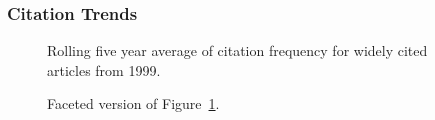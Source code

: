 \documentclass[
  10pt,
  letterpaper,
  DIV=11,
  numbers=noendperiod,
  twoside]{scrartcl}
\begin{document}
\subsubsection*{Citation Trends}\label{citation-trends-23}

\begin{figure}


\caption{\label{fig-citation-spaghetti-1999}Rolling five year average of
citation frequency for widely cited articles from 1999.}

\end{figure}%

\begin{figure}


\caption{\label{fig-citation-facet-1999}Faceted version of
Figure~\ref{fig-citation-spaghetti-1999}.}

\end{figure}%
\end{document}
